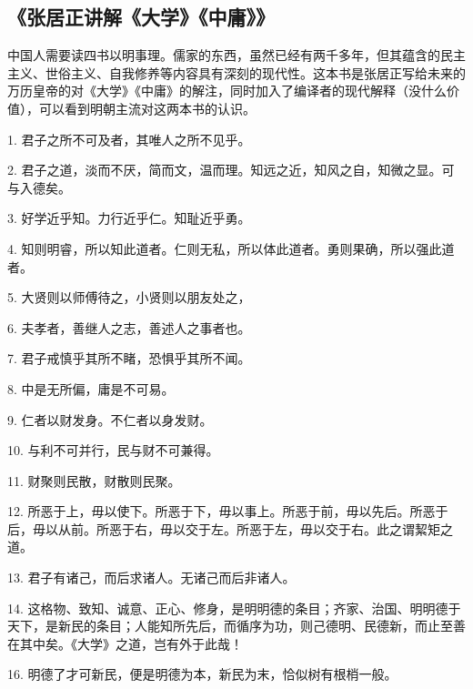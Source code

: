 \subsection{《张居正讲解《大学》《中庸》》}

中国人需要读四书以明事理。儒家的东西，虽然已经有两千多年，但其蕴含的民主主义、世俗主义、自我修养等内容具有深刻的现代性。这本书是张居正写给未来的万历皇帝的对《大学》《中庸》的解注，同时加入了编译者的现代解释（没什么价值），可以看到明朝主流对这两本书的认识。

1. 君子之所不可及者，其唯人之所不见乎。

2. 君子之道，淡而不厌，简而文，温而理。知远之近，知风之自，知微之显。可与入德矣。

3. 好学近乎知。力行近乎仁。知耻近乎勇。

4. 知则明睿，所以知此道者。仁则无私，所以体此道者。勇则果确，所以强此道者。

5. 大贤则以师傅待之，小贤则以朋友处之，

6. 夫孝者，善继人之志，善述人之事者也。

7. 君子戒慎乎其所不睹，恐惧乎其所不闻。

8. 中是无所偏，庸是不可易。

9. 仁者以财发身。不仁者以身发财。

10. 与利不可并行，民与财不可兼得。

11. 财聚则民散，财散则民聚。

12. 所恶于上，毋以使下。所恶于下，毋以事上。所恶于前，毋以先后。所恶于后，毋以从前。所恶于右，毋以交于左。所恶于左，毋以交于右。此之谓絜矩之道。

13. 君子有诸己，而后求诸人。无诸己而后非诸人。

14. 这格物、致知、诚意、正心、修身，是明明德的条目；齐家、治国、明明德于天下，是新民的条目；人能知所先后，而循序为功，则己德明、民德新，而止至善在其中矣。《大学》之道，岂有外于此哉！

16. 明德了才可新民，便是明德为本，新民为末，恰似树有根梢一般。

